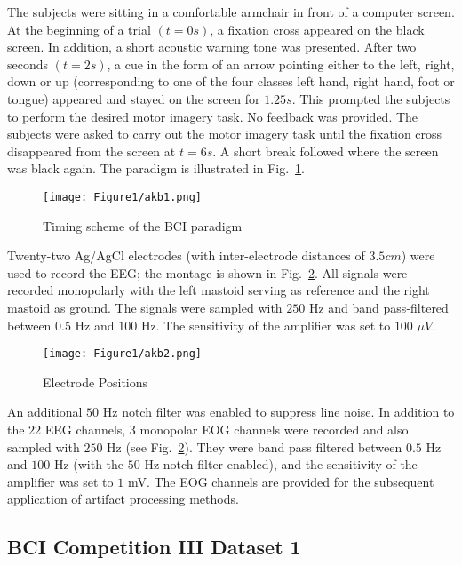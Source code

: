 The subjects were sitting in a comfortable armchair in front of a computer screen. At the beginning of a trial $(t = 0 s)$, a fixation cross appeared on the black screen. In addition, a short acoustic warning tone was presented. After two seconds $(t = 2 s)$, a cue in the form of an arrow pointing either to the left, right, down or up (corresponding to one of the four classes left hand, right hand, foot or tongue) appeared and stayed on the screen for $1.25 s$. This prompted the subjects to perform the desired motor imagery task. No feedback was provided. The subjects were asked to carry out the motor imagery task until the fixation cross disappeared from the screen at $t = 6 s$. A short break followed where the screen was black again. The paradigm is illustrated in Fig.~\ref{akb1}.
   \begin{figure}[hbtp]
\centering
\texttt{[image: Figure1/akb1.png]}
\caption{Timing scheme of the BCI paradigm}
\label{akb1}
\end{figure}


Twenty-two Ag/AgCl electrodes (with inter-electrode distances of $3.5 cm$) were used to record the EEG; the montage is shown in Fig.~\ref{akb2}. All signals were recorded monopolarly with the left mastoid serving as reference and the right mastoid as ground. The signals were sampled with $250$ Hz and band pass-filtered between $0.5$ Hz and $100$ Hz. The sensitivity of the amplifier was set to $100$ $ \mu V $. 
\begin{figure}[hbtp]
\centering
\texttt{[image: Figure1/akb2.png]}
\caption{Electrode Positions}
\label{akb2}
\end{figure}

An additional $50$ Hz notch filter was enabled to suppress line noise. In addition to the $22$ EEG channels, $3$ monopolar EOG channels were recorded and also sampled with $250$ Hz (see Fig.~\ref{akb2}). They were band pass filtered between $0.5$ Hz and $100$ Hz (with the $50$ Hz notch filter enabled), and the sensitivity of the amplifier was set to $1$ mV. The EOG channels are provided for the subsequent application of artifact processing methods.
   
\subsection{BCI Competition III Dataset 1}

